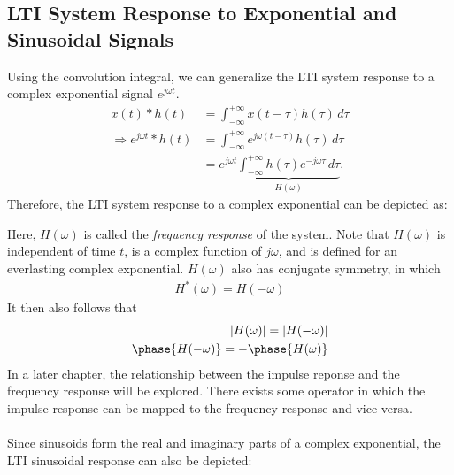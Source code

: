 \documentclass{report}
\begin{document}
\subsection{LTI System Response to Exponential and Sinusoidal Signals}
Using the convolution integral, we can generalize the LTI system response to a complex exponential signal $e^{j\omega t}$.
\begin{align*}
    x(t) * h(t) &= \int_{-\infty}^{+\infty} x(t-\tau)h(\tau) \,d\tau \\
    \Longrightarrow e^{j\omega t} * h(t) &= \int_{-\infty}^{+\infty} e^{j\omega (t-\tau)}h(\tau) \,d\tau \\
    &= e^{j\omega t} \underbrace{\int_{-\infty}^{+\infty} h(\tau)e^{-j\omega\tau} \,d\tau}_\textrm{$H(\omega)$}.
\end{align*}
Therefore, the LTI system response to a complex exponential can be depicted as: 
\begin{center}
\end{center}
Here, $H(\omega)$ is called the \emph{frequency response} of the system. Note that $H(\omega)$ is independent of time $t$, 
is a complex function of $j\omega$, and is defined for an everlasting complex exponential. $H(\omega)$ also has conjugate symmetry, in which 
\begin{align}
    H^*(\omega) = H(-\omega)
\end{align}
It then also follows that 
\begin{align}
    |H(\omega)| = |H(-\omega)| \\
    \phase{H(-\omega)} = -\phase{H(\omega)}
\end{align}
In a later chapter, the relationship between the impulse reponse and the frequency response will be explored. There exists some operator in which the impulse response can be 
mapped to the frequency response and vice versa.
\\ \\
Since sinusoids form the real and imaginary parts of a complex exponential, the LTI sinusoidal response can also be depicted: 
\begin{center}
\end{center}
\end{document}
